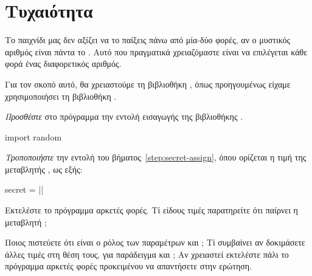 \documentclass[a4paper,11pt,oneside]{book}
\begin{document}
\section{Τυχαιότητα}

Το παιχνίδι μας δεν αξίζει να το παίξεις πάνω από μία-δύο φορές, αν ο μυστικός αριθμός είναι πάντα το . Αυτό που πραγματικά χρειαζόμαστε είναι να επιλέγεται κάθε φορά ένας διαφορετικός αριθμός.

Για τον σκοπό αυτό, θα χρειαστούμε τη βιβλιοθήκη , όπως προηγουμένως είχαμε χρησιμοποιήσει τη βιβλιοθήκη . 

\begin{step}
\label{step:secret-random}
\emph{Προσθέστε} στο πρόγραμμα την εντολή εισαγωγής της βιβλιοθήκης .

\begin{pynew}
import random
\end{pynew}

\emph{Τροποποιήστε} την εντολή του βήματος~\ref{step:secret-assign}, όπου ορίζεται η τιμή της μεταβλητής , ως εξής:

\begin{pyplain}
secret = ||
\end{pyplain}

Εκτελέστε το πρόγραμμα αρκετές φορές. Τί είδους τιμές παρατηρείτε ότι παίρνει η μεταβλητή ;



\marginnote[14pt]{\icondiscuss}
\dottedline

Ποιος πιστεύετε ότι είναι ο ρόλος των παραμέτρων  και ; Τί συμβαίνει αν δοκιμάσετε άλλες τιμές στη θέση τους, για παράδειγμα  και ; Αν χρειαστεί εκτελέστε πάλι το πρόγραμμα αρκετές φορές προκειμένου να απαντήσετε στην ερώτηση.

\marginnote[14pt]{\icondiscuss}
\dottedline








\end{step}
\end{document}
